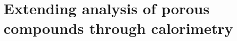 
\graphicspath{ {\thisch/figures/} }

\chapter{Extending analysis of porous 
compounds through calorimetry}\label{calo}





\pagebreak



 